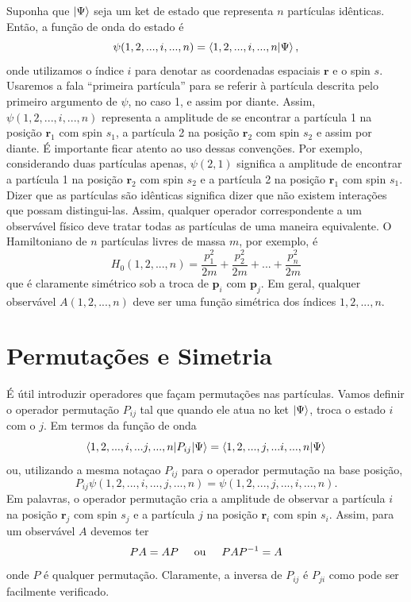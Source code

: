 \documentclass{article}
\begin{document}
Suponha que $\ket{\Psi}$ seja um ket de estado que representa $n$ partículas idênticas. Então, a função de onda do estado é
\begin{equation}
    \psi(1,2,...,i,...,n) = \braket{1,2,...,i,...,n|\Psi},
\end{equation}
onde utilizamos o índice $i$ para denotar as coordenadas espaciais $\mathbf{r}$ e o spin $s$. Usaremos a fala ``primeira partícula'' para se referir à partícula descrita pelo primeiro argumento de $\psi$, no caso 1, e assim por diante. Assim, $\psi(1,2,...,i,...,n)$ representa a amplitude de se encontrar a partícula 1 na posição $\mathbf{r}_1$ com spin $s_1$, a partícula 2 na posição $\mathbf{r}_2$ com spin $s_2$ e assim por diante. É importante ficar atento ao uso dessas convenções. Por exemplo, considerando duas partículas apenas, $\psi(2,1)$ significa a amplitude de encontrar a partícula 1 na posição $\mathbf{r}_2$ com spin $s_2$ e a partícula 2 na posição $\mathbf{r}_1$ com spin $s_1$. Dizer que as partículas são idênticas significa dizer que não existem interações que possam distingui-las. Assim, qualquer operador correspondente a um observável físico deve tratar todas as partículas de uma maneira equivalente. O Hamiltoniano de $n$ partículas livres de massa $m$, por exemplo, é
\begin{equation}
    H_{0}(1,2,...,n) = \frac{p_1^2}{2m} +\frac{p_2^2}{2m} + ... +\frac{p_n^2}{2m}  
\end{equation}
que é claramente simétrico sob a troca de $\mathbf{p}_i$ com $\mathbf{p}_j$. Em geral, qualquer observável $A(1,2,...,n)$ deve ser uma função simétrica dos índices $1,2,..., n$.


\section{Permutações e Simetria}

É útil introduzir operadores que façam permutações nas partículas. Vamos definir o operador permutação $P_{ij}$ tal que quando ele atua no ket $\ket{\Psi}$, troca o estado $i$ com o $j$. Em termos da função de onda
\begin{equation}
    \braket{1,2,...,i,...j,...,n|P_{ij}|\Psi} = \braket{1,2,...,j,...i,...,n|\Psi}
\end{equation}
ou, utilizando a mesma notaçao $P_{ij}$ para o operador permutação na base posição,
\begin{equation}
    P_{ij}\psi(1,2,...,i,...,j,...,n) = \psi(1,2,...,j,...,i,...,n).
\end{equation}
Em palavras, o operador permutação cria a amplitude de observar a partícula $i$ na posição $\mathbf{r}_j$ com spin $s_j$ e a partícula $j$ na posição $\mathbf{r}_i$ com spin $s_i$. Assim, para um observável $A$ devemos ter
\begin{equation}
    PA = AP \hspace{0.5cm} \text{ou} \hspace{0.5cm} PAP^{-1} = A
\end{equation}
onde $P$ é qualquer permutação. Claramente, a inversa de $P_{ij}$ é $P_{ji}$ como pode ser facilmente verificado.
\end{document}
